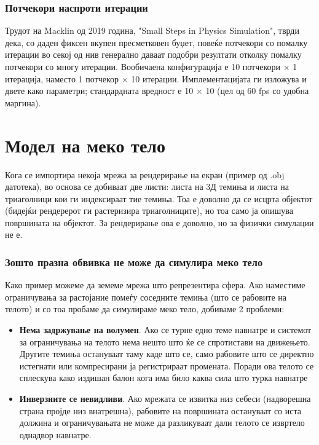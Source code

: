 \subsection{Потчекори наспроти итерации}
Трудот на Macklin од 2019 година, "Small Steps in Physics Simulation", тврди дека, со даден фиксен вкупен пресметковен буџет, повеќе потчекори со помалку итерации во секој од нив генерално даваат подобри резултати отколку помалку потчекори со многу итерации. Вообичаена конфигурација е 10 потчекори $\times$ 1 итерација, наместо 1 потчекор $\times$ 10 итерации. Имплементацијата ги изложува и двете како параметри; стандардната вредност е 10 $\times$ 10 (цел од 60 fps со удобна маргина).


\chapter{Модел на меко тело}
Кога се импортира некоја мрежа за рендерирање на екран (пример од .obj датотека), во основа се добиваат две листи: листа на 3Д темиња и листа на триаголници кои ги индексираат тие темиња. Тоа е доволно да се исцрта објектот (бидејќи рендерерот ги растеризира триаголниците), но тоа само ја опишува површината на објектот. За рендерирање ова е доволно, но за физички симулации не е.

\subsection{Зошто празна обвивка не може да симулира меко тело}
Како пример можеме да земеме мрежа што репрезентира сфера. Ако наместиме ограничувања за растојание помеѓу соседните темиња (што се рабовите на телото) и со тоа пробаме да симулираме меко тело, добиваме 2 проблеми:

\begin{itemize}
	\item \textbf{Нема задржување на волумен}. Ако се турне едно теме навнатре и системот за ограничувања на телото нема нешто што ќе се спротистави на движењето. Другите темиња остануваат таму каде што се, само рабовите што се директно истегнати или компресирани ја регистрираат промената. Поради ова телото се сплескува како издишан балон кога има било каква сила што турка навнатре
	\item \textbf{Инверзиите се невидливи}. Ако мрежата се извитка низ себеси (надворешна страна пројде низ внатрешна), рабовите на површината остануваат со иста должина и ограничувањата не може да разликуваат дали телото се извртело однадвор навнатре.
\end{itemize}


